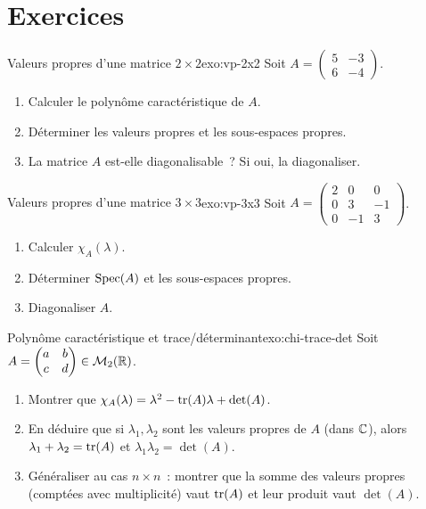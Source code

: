 \section{Exercices}\label{sec:exos-vp}

\begin{exercise}{\basic{} Valeurs propres d'une matrice $2\times 2$}{exo:vp-2x2}
  Soit $A=\begin{pmatrix}5&-3\\6&-4\end{pmatrix}$.
  \begin{enumerate}[label=(\alph*)]
    \item Calculer le polynôme caractéristique de $A$.
    \item Déterminer les valeurs propres et les sous-espaces propres.
    \item La matrice $A$ est-elle diagonalisable~? Si oui, la
      diagonaliser.
  \end{enumerate}
\end{exercise}

\begin{exercise}{\basic{} Valeurs propres d'une matrice $3\times 3$}{exo:vp-3x3}
  Soit $A=\begin{pmatrix}2&0&0\\0&3&-1\\0&-1&3\end{pmatrix}$.
  \begin{enumerate}[label=(\alph*)]
    \item Calculer $\chi_A(\lambda)$.
    \item Déterminer $\operatorname{Spec}(A)$ et les sous-espaces propres.
    \item Diagonaliser $A$.
  \end{enumerate}
\end{exercise}

\begin{exercise}{\basic{} Polynôme caractéristique et trace/déterminant}{exo:chi-trace-det}
  Soit $A=\begin{pmatrix}a&b\\c&d\end{pmatrix}\in\mathcal{M}_2({\mathbb{R}})$.
  \begin{enumerate}[label=(\alph*)]
    \item Montrer que $\chi_A(\lambda)=\lambda^2-\operatorname{tr}(A)\lambda+\det(A)$.
    \item En déduire que si $\lambda_1,\lambda_2$ sont les valeurs
      propres de $A$ (dans ${\mathbb{C}}$), alors $\lambda_1+\lambda_2=\operatorname{tr}(A)$
      et $\lambda_1\lambda_2=\det(A)$.
    \item Généraliser au cas $n\times n$~: montrer que la somme des
      valeurs propres (comptées avec multiplicité) vaut $\operatorname{tr}(A)$ et
      leur produit vaut $\det(A)$.
  \end{enumerate}
\end{exercise}


